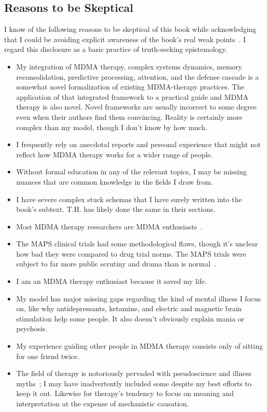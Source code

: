 \documentclass[11pt,oneside]{book}
\let\cite\parencite
\begin{document}
\subsection*{Reasons to be Skeptical}
I know of the following reasons to be skeptical of this book while acknowledging that I could be avoiding explicit awareness of the book's real weak points~\cite{yudkowskiWeak}. I regard this disclosure as a basic practice of truth-seeking epistemology.
\begin{itemize}
    \item My integration of MDMA therapy, complex systems dynamics, memory reconsolidation, predictive processing, attention, and the defense cascade is a somewhat novel formalization of existing MDMA-therapy practices. The application of that integrated framework to a practical guide and MDMA therapy is also novel. Novel frameworks are usually incorrect to some degree even when their authors find them convincing. Reality is certainly more complex than my model, though I don't know by how much.
    \item I frequently rely on anecdotal reports and personal experience that might not reflect how MDMA therapy works for a wider range of people.
    \item Without formal education in any of the relevant topics, I may be missing nuances that are common knowledge in the fields I draw from.
    \item I have severe complex stuck schemas that I have surely written into the book's subtext. T.H. has likely done the same in their sections.
    \item Most MDMA therapy researchers are MDMA enthusiasts~\cite{jylkka2025researcherExperiences}.
    \item The MAPS clinical trials had some methodological flaws, though it's unclear how bad they were compared to drug trial norms. The MAPS trials were subject to far more public scrutiny and drama than is normal~\cite{nytPsymposia}.
    \item I am an MDMA therapy enthusiast because it saved my life.
    \item My model has major missing gaps regarding the kind of mental illness I focus on, like why antidepressants, ketamine, and electric and magnetic brain stimulation help some people. It also doesn't obviously explain mania or psychosis.
    \item My experience guiding other people in MDMA therapy consists only of sitting for one friend twice.
    \item The field of therapy is notoriously pervaded with pseudoscience and illness myths~\cite{luckPolyvagal}; I may have inadvertently included some despite my best efforts to keep it out. Likewise for therapy's tendency to focus on meaning and interpretation at the expense of mechanistic causation.

\end{itemize}
\end{document}
